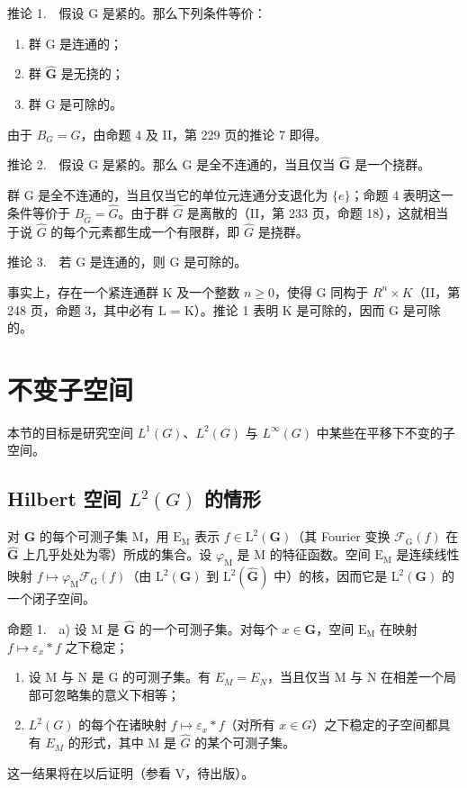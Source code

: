 推论 1.　假设 G 是紧的。那么下列条件等价：

\begin{enumerate}
\def\labelenumi{(\roman{enumi})}
\item
  群 G 是连通的；
\item
  群 \(\widehat{\mathbf{G}}\) 是无挠的；
\item
  群 G 是可除的。
\end{enumerate}

由于 \(B_{G} = G\)，由命题 4 及 II，第 229 页的推论 7 即得。

推论 2.　假设 G 是紧的。那么 G 是全不连通的，当且仅当 \(\widehat{\mathbf{G}}\) 是一个挠群。

群 G 是全不连通的，当且仅当它的单位元连通分支退化为 \(\{e\}\)；命题 4 表明这一条件等价于 \(B_{\widehat{G}} = \widehat{G}\)。由于群 \(\widehat{G}\) 是离散的（II，第 233 页，命题 18），这就相当于说 \(\widehat{G}\) 的每个元素都生成一个有限群，即 \(\widehat{G}\) 是挠群。

推论 3.　若 G 是连通的，则 G 是可除的。

事实上，存在一个紧连通群 K 及一个整数 \(n \geqslant 0\)，使得 G 同构于 \(R^{n} \times K\)（II，第 248 页，命题 3，其中必有 L = K）。推论 1 表明 K 是可除的，因而 G 是可除的。

\section{不变子空间}

本节的目标是研究空间 \(L^{1}(G)\)、\(L^{2}(G)\) 与 \(L^{\infty}(G)\) 中某些在平移下不变的子空间。

\subsection{\texorpdfstring{Hilbert 空间 \(L^{2}(G)\) 的情形}{Hilbert 空间 L\^{}\{2\}(G) 的情形}}

对 \(\widehat{\mathbf{G}}\) 的每个可测子集 M，用 \(\mathrm{E_M}\) 表示 \(f \in \mathrm{L}^2(\mathbf{G})\)（其 Fourier 变换 \(\mathcal{F}_{\mathrm{G}}(f)\) 在 \(\widehat{\mathbf{G}}\) 上几乎处处为零）所成的集合。设 \(\varphi_{\mathrm{M}}\) 是 M 的特征函数。空间 \(\mathrm{E_M}\) 是连续线性映射 \(f \mapsto \varphi_{\mathrm{M}}\mathcal{F}_{\mathrm{G}}(f)\)（由 \(\mathrm{L}^2(\mathbf{G})\) 到 \(\mathrm{L}^2(\widehat{\mathbf{G}})\) 中）的核，因而它是 \(\mathrm{L}^2(\mathbf{G})\) 的一个闭子空间。

命题 1.　a) 设 M 是 \(\widehat{\mathbf{G}}\) 的一个可测子集。对每个 \(x \in \mathbf{G}\)，空间 \(\mathrm{E}_{\mathrm{M}}\) 在映射 \(f \mapsto \varepsilon_x * f\) 之下稳定；

\begin{enumerate}
\def\labelenumi{\alph{enumi})}
\setcounter{enumi}{1}
\item
  设 M 与 N 是 G 的可测子集。有 \(E_{M} = E_{N}\)，当且仅当 M 与 N 在相差一个局部可忽略集的意义下相等；
\item
  \(L^{2}(G)\) 的每个在诸映射 \(f \mapsto \varepsilon_{x} * f\)（对所有 \(x \in G\)）之下稳定的子空间都具有 \(E_{M}\) 的形式，其中 M 是 \(\widehat{G}\) 的某个可测子集。
\end{enumerate}

这一结果将在以后证明（参看 V，待出版）。
